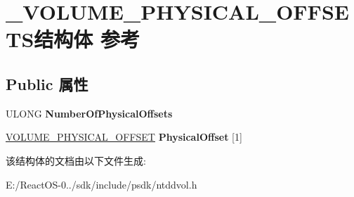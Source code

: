 \hypertarget{struct___v_o_l_u_m_e___p_h_y_s_i_c_a_l___o_f_f_s_e_t_s}{}\section{\+\_\+\+V\+O\+L\+U\+M\+E\+\_\+\+P\+H\+Y\+S\+I\+C\+A\+L\+\_\+\+O\+F\+F\+S\+E\+T\+S结构体 参考}
\label{struct___v_o_l_u_m_e___p_h_y_s_i_c_a_l___o_f_f_s_e_t_s}
\subsection*{Public 属性}
\begin{DoxyCompactItemize}
\item 
\mbox{\label{struct___v_o_l_u_m_e___p_h_y_s_i_c_a_l___o_f_f_s_e_t_s_ab5f2ae07ca93daf06ad25ea2f75d5efa}} 
U\+L\+O\+NG {\bfseries Number\+Of\+Physical\+Offsets}
\item 
\mbox{\label{struct___v_o_l_u_m_e___p_h_y_s_i_c_a_l___o_f_f_s_e_t_s_a9bf204dde504bdd3926deaa3dfa83820}} 
\hyperlink{struct___v_o_l_u_m_e___p_h_y_s_i_c_a_l___o_f_f_s_e_t}{V\+O\+L\+U\+M\+E\+\_\+\+P\+H\+Y\+S\+I\+C\+A\+L\+\_\+\+O\+F\+F\+S\+ET} {\bfseries Physical\+Offset} \mbox{[}1\mbox{]}
\end{DoxyCompactItemize}


该结构体的文档由以下文件生成\+:\begin{DoxyCompactItemize}
\item 
E\+:/\+React\+O\+S-\/0../sdk/include/psdk/ntddvol.\+h\end{DoxyCompactItemize}
